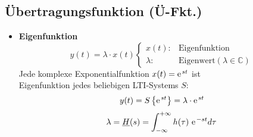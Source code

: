  \subsection{Übertragungsfunktion (Ü-Fkt.)}
  \begin{itemize}      
      \item{\textbf{Eigenfunktion}}\\
          \[
              y(t) = \lambda\cdot x(t)
              \begin{cases}
                  x(t): & \text{Eigenfunktion}\\
                  \lambda: & \text{Eigenwert}(\lambda\in\mathbb{C})
              \end{cases}
          \]
            Jede komplexe Exponentialfunktion $x(t) = \e^{st}$ ist\\ Eigenfunktion
          jedes beliebigen LTI-Systems $S$:
          \[
          y(t) = S\left\{ \e^{st} \right\} = \lambda\cdot \e^{st}
          \]
          \[
          \lambda = \underline{H}(s) = \int_{-\infty}^{+\infty} h(\tau)\  \e^{-st} d\tau
          \]
  \end{itemize}

